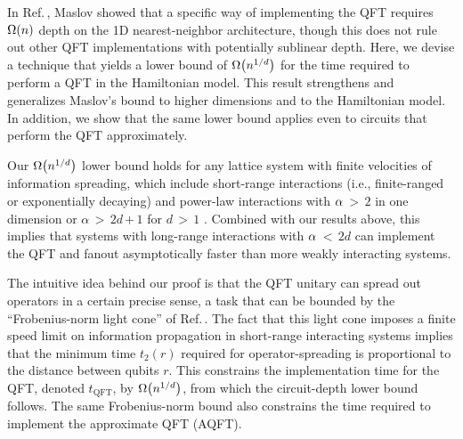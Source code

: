 In Ref.\,\cite{Maslov2007}, Maslov showed that a specific way of implementing the QFT requires $\W n$ depth on the 1D  nearest-neighbor architecture, though this does not rule out other QFT implementations with potentially sublinear depth.
Here, we devise a technique that yields a lower bound of $\W {n^{1/d}}$ for the time required to perform a QFT in the Hamiltonian model.
This result strengthens and generalizes Maslov's bound to higher dimensions and to the Hamiltonian model.
In addition, we show that the same lower bound applies even to circuits that perform the QFT approximately.

Our $\W {n^{1/d}}$ lower bound holds for any lattice system with finite velocities of information spreading, which include short-range interactions (i.e., finite-ranged or exponentially decaying) and power-law interactions with $\alpha$\,$>$\,$2$ in one dimension or $\alpha$\,$>$\,$2d$\,$+$\,$1$ for $d$\,$>$\,$1$ \cite{Lieb1972,Chen2019,kuwaharaStrictlyLinearLight2020}.
Combined with our results above, this implies that systems with long-range interactions with $\alpha$\,$<$\,$2d$ can implement the QFT and fanout asymptotically faster than more weakly interacting systems.

The intuitive idea behind our proof is that the QFT unitary can spread out operators in a certain precise sense, a task that can be bounded by the ``Frobenius-norm light cone'' of Ref.\,\cite{Tran2020hierarchylinearlightcones}.
The fact that this light cone imposes a finite speed limit on information propagation in short-range interacting systems implies that the minimum time $t_2(r)$ required for operator-spreading is proportional to the distance between qubits $r$.
This constrains the implementation time for the QFT, denoted $t_\mathrm{QFT}$, by $\W {n^{1/d}}$, from which the circuit-depth lower bound follows.
The same Frobenius-norm bound also constrains the time required to implement the approximate QFT (AQFT).

